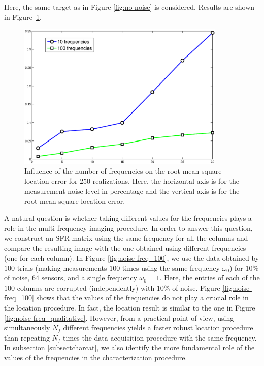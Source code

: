 Here, the same target as in Figure \ref{fig:no-noise} is
considered. Results are shown in
Figure~\ref{fig:stats-freq-noise}.

\begin{figure}
\centering\includegraphics[height=7cm]{model/std_localization.eps}

\caption{\label{fig:stats-freq-noise}Influence of the number of
frequencies on the root mean square location error for $250$
realizations. Here, the horizontal axis is for the measurement
noise level in percentage and the vertical axis is for the root
mean square location error.}
\end{figure}

A natural question is whether taking different values for the
frequencies plays a role in the multi-frequency imaging procedure.
In order to answer this question, we construct an SFR matrix using
the same frequency for all the columns and compare the resulting
image with the one obtained using different frequencies (one for
each column). In Figure \ref{fig:noise-freq_100}, we use the data
obtained by $100$ trials (making measurements $100$ times using
the same frequency $\omega_0$) for $10\%$ of noise, $64$ sensors,
and a single frequency $\omega_0=1$. Here, the entries of each of
the $100$ columns are corrupted (independently) with $10\%$ of
noise. Figure \ref{fig:noise-freq_100} shows that the values of
the frequencies do not play a crucial role in the location
procedure. In fact, the location result is similar to the one in
Figure \ref{fig:noise-freq_qualitative}. However, from a practical
point of view, using simultaneously $N_f$ different frequencies
yields a faster robust location procedure than repeating $N_f$ times
the data acquisition procedure with the same frequency. In
subsection \ref{subsectcharcat}, we also identify the more
fundamental role of the values of the frequencies in the
characterization procedure.

